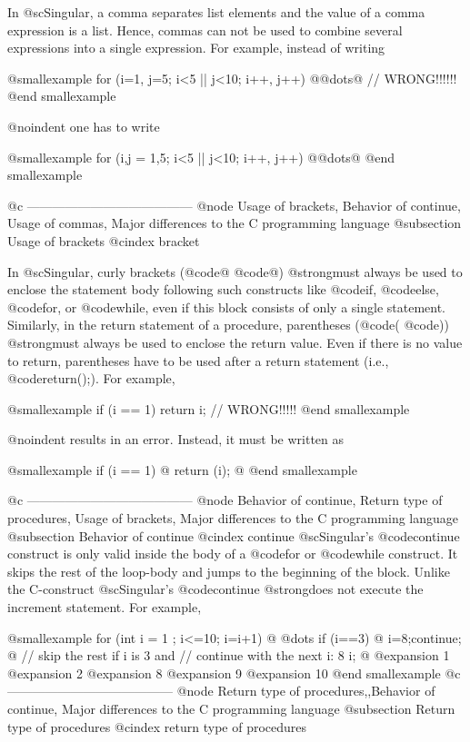 In @sc{Singular}, a comma separates list elements and the value of a comma
expression is a list.
Hence, commas can not be used to combine several expressions into
a single expression. For example, instead of writing

@smallexample
for (i=1, j=5; i<5 || j<10; i++, j++) @{@dots{}@} // WRONG!!!!!!
@end smallexample

@noindent one has to write

@smallexample
for (i,j = 1,5; i<5 || j<10; i++, j++) @{@dots{}@}
@end smallexample

@c ---------------------------------------
@node Usage of brackets, Behavior of continue, Usage of commas, Major differences to the C programming language
@subsection Usage of brackets
@cindex bracket

In @sc{Singular}, curly brackets (@code{@{} @code{@}}) @strong{must
always} be used to enclose the statement body following such constructs
like @code{if}, @code{else}, @code{for}, or @code{while}, even if this
block consists of only a single statement. Similarly, in the return
statement of a procedure, parentheses (@code{(} @code{)}) @strong{must
always} be used to enclose the return value.  Even if there is no value
to return, parentheses have to be used after a return statement
(i.e., @code{return();}).  For example,

@smallexample
if (i == 1) return i;    // WRONG!!!!!
@end smallexample

@noindent results in an error. Instead, it must be written as

@smallexample
if (i == 1) @{ return (i); @}
@end smallexample

@c ---------------------------------------
@node  Behavior of continue, Return type of procedures, Usage of brackets, Major differences to the C programming language
@subsection Behavior of continue
@cindex continue
@sc{Singular}'s @code{continue} construct is only valid inside the body
of a @code{for} or @code{while} construct. It skips the rest of the
loop-body and jumps to the beginning of the block. Unlike the
C-construct @sc{Singular}'s @code{continue} @strong{does not execute the
increment statement}. For example,

@smallexample
for (int i = 1 ; i<=10; i=i+1)
@{
   @dots{}
   if (i==3) @{ i=8;continue; @}
     // skip the rest if i is 3 and
     // continue with the next i: 8
   i;
@}
@expansion{} 1
@expansion{} 2
@expansion{} 8
@expansion{} 9
@expansion{} 10
@end smallexample
@c ---------------------------------------
@node Return type of procedures,,Behavior of continue, Major differences to the C programming language
@subsection Return type of procedures
@cindex return type of procedures

